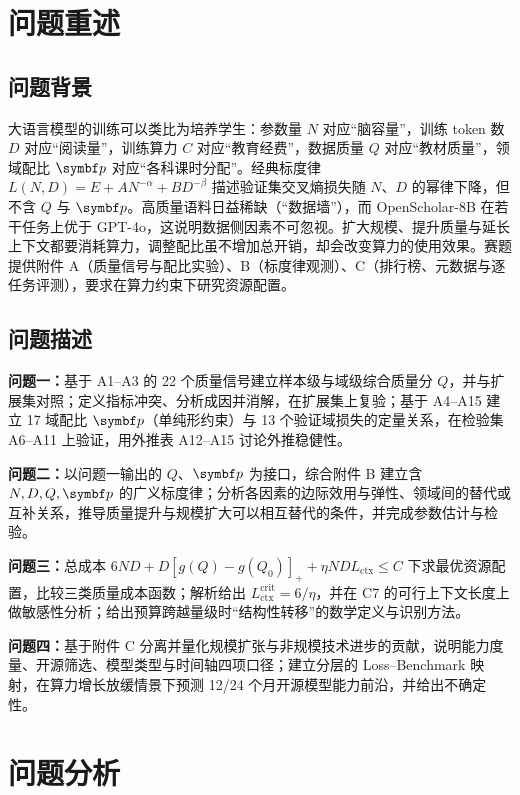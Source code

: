 \section{问题重述}

\subsection{问题背景}

大语言模型的训练可以类比为培养学生：参数量 $N$ 对应“脑容量”，训练 token 数 $D$ 对应“阅读量”，训练算力 $C$ 对应“教育经费”，数据质量 $Q$ 对应“教材质量”，领域配比 $\bp$ 对应“各科课时分配”。经典标度律 $L(N,D)=E+AN^{-\alpha}+BD^{-\beta}$ 描述验证集交叉熵损失随 $N$、$D$ 的幂律下降\cite{hoffmann,bahri}，但不含 $Q$ 与 $\bp$。高质量语料日益稀缺（“数据墙”），而 OpenScholar-8B 在若干任务上优于 GPT-4o\cite{asai}，这说明数据侧因素不可忽视。扩大规模、提升质量与延长上下文都要消耗算力，调整配比虽不增加总开销，却会改变算力的使用效果。赛题提供附件 A（质量信号与配比实验）、B（标度律观测）、C（排行榜、元数据与逐任务评测），要求在算力约束下研究资源配置。

\subsection{问题描述}

\textbf{问题一：}基于 A1–A3 的 22 个质量信号建立样本级与域级综合质量分 $Q$，并与扩展集对照；定义指标冲突、分析成因并消解，在扩展集上复验；基于 A4–A15 建立 17 域配比 $\bp$（单纯形约束）与 13 个验证域损失的定量关系，在检验集 A6–A11 上验证，用外推表 A12–A15 讨论外推稳健性。

\textbf{问题二：}以问题一输出的 $Q$、$\bp$ 为接口，综合附件 B 建立含 $N,D,Q,\bp$ 的广义标度律；分析各因素的边际效用与弹性、领域间的替代或互补关系，推导质量提升与规模扩大可以相互替代的条件，并完成参数估计与检验。

\textbf{问题三：}总成本 $6ND+D[g(Q)-g(Q_0)]_++\eta NDL_{\mathrm{ctx}}\le C$ 下求最优资源配置，比较三类质量成本函数；解析给出 $L_{\mathrm{ctx}}^{\mathrm{crit}}=6/\eta$，并在 C7 的可行上下文长度上做敏感性分析；给出预算跨越量级时“结构性转移”的数学定义与识别方法。

\textbf{问题四：}基于附件 C 分离并量化规模扩张与非规模技术进步的贡献，说明能力度量、开源筛选、模型类型与时间轴四项口径；建立分层的 Loss–Benchmark 映射，在算力增长放缓情景下预测 12/24 个月开源模型能力前沿，并给出不确定性。

\section{问题分析}

